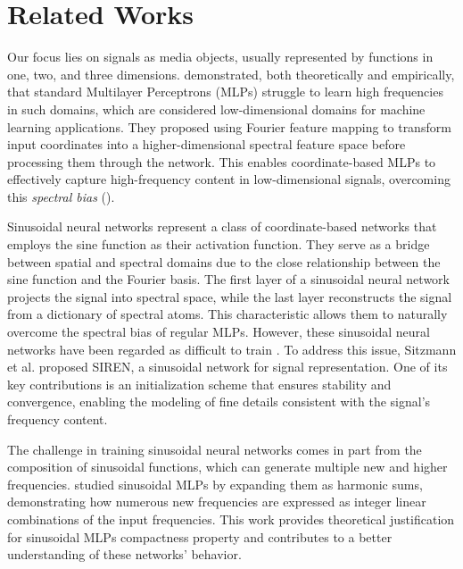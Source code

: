 \section{Related Works}

Our focus lies on signals as media objects, usually represented by functions in one, two, and three dimensions. \cite{tancik2020fourfeat} demonstrated, both theoretically and empirically, that standard Multilayer Perceptrons (MLPs) struggle to learn high frequencies in such domains, which are considered low-dimensional domains for machine learning applications. They proposed using Fourier feature mapping to transform input coordinates into a higher-dimensional spectral feature space before processing them through the network. This enables coordinate-based MLPs to effectively capture high-frequency content in low-dimensional signals, overcoming this \textit{spectral bias} (\cite{rahaman2018spectral}).

Sinusoidal neural networks represent a class of coordinate-based networks that employs the sine function as their activation function. They serve as a bridge between spatial and spectral domains due to the close relationship between the sine function and the Fourier basis. The first layer of a sinusoidal neural network projects the signal into spectral space, while the last layer reconstructs the signal from a dictionary of spectral atoms. This characteristic allows them to naturally overcome the spectral bias of regular MLPs. However, these sinusoidal neural networks have been regarded as difficult to train \cite{taming2017}. To address this issue, Sitzmann et al. \cite{sitzmann2019siren} proposed SIREN, a sinusoidal network for signal representation. One of its key contributions is an initialization scheme that ensures stability and convergence, enabling the modeling of fine details consistent with the signal’s frequency content.

The challenge in training sinusoidal neural networks comes in part from the composition of sinusoidal functions, which can generate multiple new and higher frequencies. \cite{novello2022understanding} studied sinusoidal MLPs by expanding them as harmonic sums, demonstrating how numerous new frequencies are expressed as integer linear combinations of the input frequencies. This work provides theoretical justification for sinusoidal MLPs compactness property and contributes to a better understanding of these networks’ behavior.

